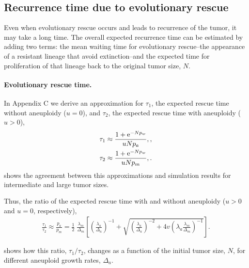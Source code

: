\documentclass[12pt]{extarticle}
\newcommand{\e}{{\rm e}}
\begin{document}

\subsection*{Recurrence time due to evolutionary rescue}

Even when evolutionary rescue occurs and leads to recurrence of the tumor, it may take a long time.
The overall expected recurrence time can be estimated by adding two terms: the mean waiting time for evolutionary rescue--the appearance of a resistant lineage that avoid extinction--and the expected time for proliferation of that lineage back to the original tumor size, $N$.

\paragraph{Evolutionary rescue time.}
In Appendix C we derive an approximation for $\tau_1$, the expected rescue time without aneuploidy ($u=0$), and $\tau_2$, the expected rescue time with aneuploidy ($u>0$),
\begin{align}
\tau_1 &\approx \frac{1+\e^{-Np_w}}{u N p_a} , \label{eq:limitapprox} ,\\
\tau_2 &\approx \frac{1+\e^{-Np_w}}{u N p_m} , \label{eq:limitapprox3} .
\end{align}
 shows the agreement between this approximations and simulation results for intermediate and large tumor sizes.

Thus, the ratio of the expected rescue time with and without aneuploidy ($u>0$ and $u=0$, respectively),
\begin{align}\label{eq:eqMeanTimeRatioInitialPopulationSize}
\frac{\tau_1}{\tau_2}  \approx \frac{p_a}{p_m} = 
\frac{1}{2} \; \frac{\lambda_m}{\Delta_m} \left[ \left(\frac{\lambda_a}{\Delta_a}\right)^{-1} + \sqrt{\left(\frac{\lambda_a}{\Delta_a}\right)^{-2} + 4v \left(\lambda_a\frac{\lambda_m}{\Delta_m}\right)^{-1}}\right] .
\end{align}

 shows how this ratio, $\tau_1/\tau_2$, changes as a function of the initial tumor size, $N$, for different aneuploid growth rates, $\Delta_a$.
\end{document}
